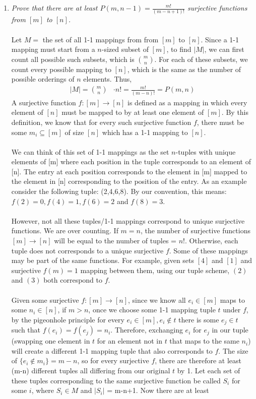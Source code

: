 \documentclass[12pt]{article}
\begin{document}
\begin{enumerate}
\item \emph{Prove that there are at least $P(m, n-1)=\frac{m!}{(m-n+1)!}$ surjective functions from $[m]$ to $[n]$.} \\
\\
Let $M =$ the set of all 1-1 mappings from from $[m]$ to $[n]$. Since a 1-1 mapping must start from a $n$-sized subset of $[m]$, to find $|M|$, we can first count all possible such subsets, which is $\binom{m}{n}$. For each of these subsets, we count every possible mapping to $[n]$, which is the same as the number of possible orderings of $n$ elements. Thus, 
\begin{align*}
|M| = \binom{m}{n} &\cdot n! = \frac{m!}{(m-n)!} = P(m, n)
\end{align*}
A surjective function $f : [m] \rightarrow [n]$ is defined as a mapping in which every element of $[n]$ must be mapped to by at least one element of $[m]$. 
By this definition, we know that for every such surjective function $f$, there must be some $m_i \subseteq [m]$ of size $[n]$ which has a 1-1 mapping to $[n]$. \\
\\
We can think of this set of 1-1 mappings as the set $n$-tuples with
unique elements of [m] where each position in the tuple corresponds to
an element of [n]. The entry at each position corresponds to the element
in [m] mapped to the element in [n] corresponding to the position of the
entry. As an example consider the following tuple: (2,4,6,8). By our convention, this means: $f(2) = 0, f(4) = 1, f(6) = 2$ and $f(8) = 3$. \\
\\
However, not all these tuples/1-1 mappings correspond to unique surjective functions. We are over counting. If $m = n$, the number of surjective functions $[m]\rightarrow[n]$ will be equal to the number of tuples = $n!$. Otherwise, each tuple does not corresponds to a unique surjective $f$. Some of these mappings may be part of the same functions. For example, given sets $[4]$ and $[1]$ and surjective $f(m) = 1$ mapping between them, using our tuple scheme, $(2)$ and $(3)$ both correspond to $f$. \\
\\
Given some surjective $f : [m] \rightarrow [n]$, since we know all $e_i \in [m]$ maps to some $n_i \in [n]$, if $m > n$, once we choose some 1-1 mapping tuple $t$ under $f$, by the pigeonhole principle for every $e_i \in [m], e_i \notin t$ there is some $e_j \in t$ such that $f(e_i) = f(e_j) = n_i$. Therefore, exchanging $e_i$ for $e_j$ in our tuple (swapping one element in $t$ for an element not in $t$ that maps to the same $n_i$) will create a different 1-1 mapping tuple that also corresponds to $f$. The size of $\{e_i \notin m_i\} = m-n$, so for every surjective $f$, there are therefore at least (m-n) different tuples all differing from our original $t$ by 1. Let each set of these tuples corresponding to the same surjective function be called $S_i$ for some $i$, where $S_i \in M$ and $|S_i|$ = m-n+1. Now there are at least

\end{enumerate}
\end{document}
